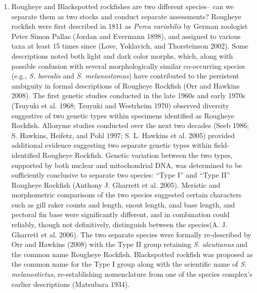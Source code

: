 \documentclass[
]{scrartcl}
\providecommand{\tightlist}{%
  \setlength{\itemsep}{0pt}\setlength{\parskip}{0pt}}\usepackage{longtable,booktabs,array}
\begin{document}
\begin{enumerate}
\def\labelenumi{\arabic{enumi}.}
\tightlist
\item
  Rougheye and Blackspotted rockfishes are two different species-- can
  we separate them as two stocks and conduct separate assessments?
  Rougheye rockfish were first described in 1811 as \emph{Perca
  variabilis} by German zoologist Peter Simon Pallas (Jordan and
  Evermann 1898), and assigned to various taxa at least 15 times since
  (Love, Yoklavich, and Thorsteinson 2002). Some descriptions noted both
  light and dark color morphs, which, along with possible confusion with
  several morphologically similar co-occurring species (e.g., \emph{S.
  borealis} and \emph{S. melanostomus}) have contributed to the
  persistent ambiguity in formal descriptions of Rougheye Rockfish (Orr
  and Hawkins 2008). The first genetic studies conducted in the late
  1960s and early 1970s (Tsuyuki et al. 1968; Tsuyuki and Westrheim
  1970) observed diversity suggestive of two genetic types within
  specimens identified as Rougheye Rockfish. Allozyme studies conducted
  over the next two decades (Seeb 1986; S. Hawkins, Heifetz, and Pohl
  1997; S. L. Hawkins et al. 2005) provided additional evidence
  suggesting two separate genetic types within field-identified Rougheye
  Rockfish. Genetic variation between the two types, supported by both
  nuclear and mitochondrial DNA, was determined to be sufficiently
  conclusive to separate two species: ``Type I'' and ``Type II''
  Rougheye Rockfish (Anthony J. Gharrett et al. 2005). Meristic and
  morphometric comparisons of the two species suggested certain
  characters such as gill raker counts and length, snout length, anal
  base length, and pectoral fin base were significantly different, and
  in combination could reliably, though not definitively, distinguish
  between the species(A. J. Gharrett et al. 2006). The two separate
  species were formally re-described by Orr and Hawkins (2008) with the
  Type II group retaining \emph{S. aleutianus} and the common name
  Rougheye Rockfish. Blackspotted rockfish was proposed as the common
  name for the Type I group along with the scientific name of \emph{S.
  melanostictus}, re-establishing nomenclature from one of the species
  complex's earlier descriptions (Matsubara 1934).
\end{enumerate}
\end{document}
